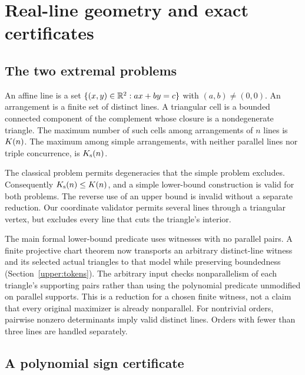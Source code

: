 \section{Real-line geometry and exact certificates}\label{sec:geometry}

\subsection{The two extremal problems}
\begin{definition}
An affine line is a set $\{(x,y)\in\mathbb{R}^2:ax+by=c\}$ with $(a,b)\ne(0,0)$. An arrangement is a finite set of distinct lines. A triangular cell is a bounded connected component of the complement whose closure is a nondegenerate triangle. The maximum number of such cells among arrangements of $n$ lines is $K(n)$. The maximum among simple arrangements, with neither parallel lines nor triple concurrence, is $K_{\mathrm{s}}(n)$.
\end{definition}

The classical problem permits degeneracies that the simple problem excludes. Consequently $K_{\mathrm{s}}(n)\le K(n)$, and a simple lower-bound construction is valid for both problems. The reverse use of an upper bound is invalid without a separate reduction. Our coordinate validator permits several lines through a triangular vertex, but excludes every line that cuts the triangle's interior.

The main formal lower-bound predicate uses witnesses with no parallel
pairs. A finite projective chart theorem now transports an arbitrary
distinct-line witness and its selected actual triangles to that model
while preserving boundedness (Section~\ref{upper:tokens}). The arbitrary
input checks nonparallelism of each triangle's supporting pairs rather
than using the polynomial predicate unmodified on parallel supports.
This is a reduction for a chosen finite witness, not a claim that every
original maximizer is already nonparallel. For nontrivial orders,
pairwise nonzero determinants imply valid distinct lines. Orders with
fewer than three lines are handled separately.

\subsection{A polynomial sign certificate}

